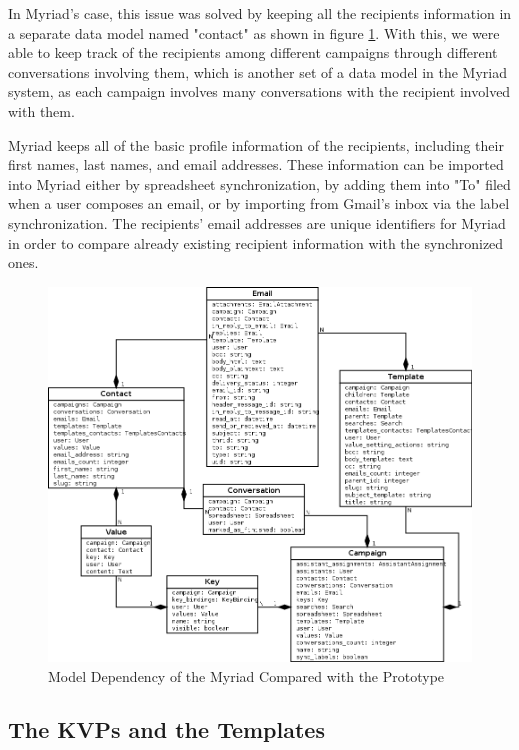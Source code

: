 In Myriad's case, this issue was solved by keeping all the recipients information in a separate data model named "contact" as shown in figure \ref{fig:UML_Draw_Final}. With this, we were able to keep track of the recipients among different campaigns through different conversations involving them, which is another set of a data model in the Myriad system, as each campaign involves many conversations with the recipient involved with them.
\vspace{1cm}

Myriad keeps all of the basic profile information of the recipients, including their first names, last names, and email addresses. These information can be imported into Myriad either by spreadsheet synchronization, by adding them into "To" filed when a user composes an email, or by importing from Gmail's inbox via the label synchronization. The recipients' email addresses are unique identifiers for Myriad in order to compare already existing recipient information with the synchronized ones. 

\begin{figure}[htbp]
	\centering
	\includegraphics[width=1.00\textwidth]{imgs/UML_Draw_Final.png}
	\caption[Model Dependency of the Myriad Compared with the Prototype]{Model Dependency of the Myriad Compared with the Prototype}
	\label{fig:UML_Draw_Final}
\end{figure}

\subsection{The \ac{KVP}s and the Templates}
\label{subsec:5.3.2:KVPsTemp}

